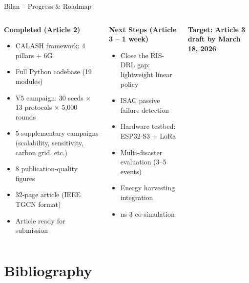 \documentclass[aspectratio=169, 11pt]{beamer}
\newcommand{\cmark}{\textcolor{okgreen}{\ding{51}}}
\begin{document}
\begin{frame}{Bilan -- Progress \& Roadmap}
\begin{columns}[T]
\begin{block}{\textbf{Completed (Article 2)}}
\begin{itemize}[nosep]
    \item[\cmark] CALASH framework: 4 pillars + 6G
    \item[\cmark] Full Python codebase (19 modules)
    \item[\cmark] V5 campaign: 30 seeds $\times$ 13 protocols $\times$ 5,000 rounds
    \item[\cmark] 5 supplementary campaigns (scalability, sensitivity, carbon grid, etc.)
    \item[\cmark] 8 publication-quality figures
    \item[\cmark] 32-page article (IEEE TGCN format)
    \item[\cmark] Article ready for submission
\end{itemize}
\end{block}

\begin{alertblock}{\textbf{Next Steps (Article 3 -- 1 week)}}
\begin{itemize}[nosep]
    \item Close the RIS-DRL gap: lightweight linear policy
    \item ISAC passive failure detection
    \item Hardware testbed: ESP32-S3 + LoRa
    \item Multi-disaster evaluation (3--5 events)
    \item Energy harvesting integration
    \item ns-3 co-simulation
\end{itemize}
\end{alertblock}

\vspace{2mm}
\centering
\textcolor{calash}{\textbf{Target: Article 3 draft by March 18, 2026}}
\end{columns}
\end{frame}

\section{Bibliography}
\end{document}

